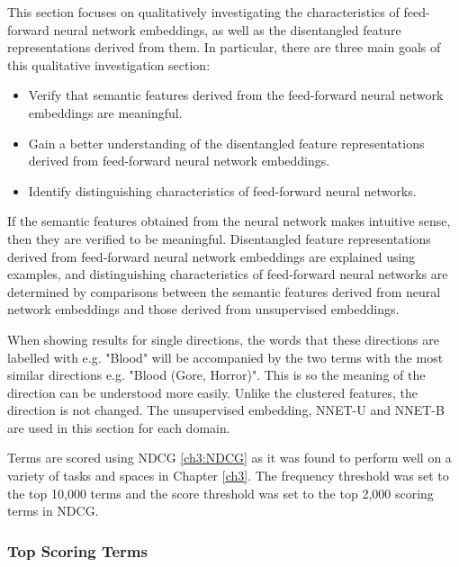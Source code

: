 This  section  focuses on qualitatively investigating the characteristics of feed-forward neural network embeddings, as well as the disentangled feature representations derived from them. In particular, there are three main goals of this qualitative investigation section:

\begin{itemize}
	\item Verify that semantic features derived from the feed-forward neural network embeddings are meaningful.
	\item Gain a better understanding of the disentangled feature representations derived from feed-forward neural network embeddings.
	\item Identify distinguishing characteristics of feed-forward neural networks. 
\end{itemize}

If the semantic features obtained from the neural network makes intuitive sense, then they are verified  to be meaningful. Disentangled feature representations derived from feed-forward neural network embeddings are explained using examples, and  distinguishing characteristics of feed-forward neural networks are determined by comparisons between the semantic features derived from neural network embeddings and those derived from unsupervised embeddings. %

When showing results for single directions, the words that these directions are labelled with e.g. "Blood" will be accompanied by the two terms with the most similar directions e.g. "Blood (Gore, Horror)". This is so the meaning of the direction can be understood more easily. Unlike the clustered features, the direction is not changed. The unsupervised embedding, NNET-U and NNET-B are used in this section for each domain.  

Terms are scored using NDCG \ref{ch3:NDCG} as it was found to perform well on a variety of tasks and spaces in Chapter \ref{ch3}. The frequency threshold was set to the top 10,000 terms and the score threshold was set to the top 2,000 scoring terms in NDCG. 

\subsubsection{Top Scoring Terms}\label{ch5:topscore}


